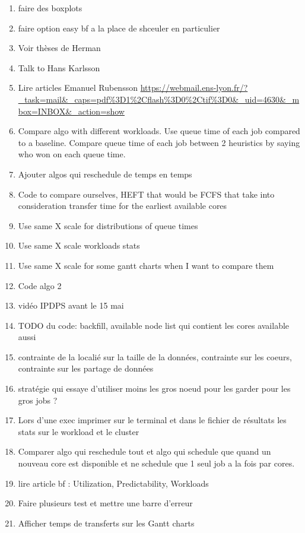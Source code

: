 \documentclass[a4paper]{article}
\begin{document}
\begin{enumerate}
			\item faire des boxplots
			\item faire option easy bf a la place de shceuler en particulier
			\item Voir thèses de Herman
			\item Talk to Hans Karlsson
			\item Lire articles Emanuel Rubensson \url{https://webmail.ens-lyon.fr/?_task=mail&_caps=pdf%3D1%2Cflash%3D0%2Ctif%3D0&_uid=4630&_mbox=INBOX&_action=show}
			\item Compare algo with different workloads. Use queue time of each job compared to a baseline. Compare queue time of each job between 2 heuristics by saying who won on each queue time.
			\item Ajouter algos qui reschedule de temps en temps
			\item Code to compare ourselves, HEFT that would be FCFS that take into consideration transfer time for the earliest available cores
			\item Use same X scale for distributions of queue times
			\item Use same X scale workloads stats
			\item Use same X scale for some gantt charts when I want to compare them
			\item Code algo 2
			\item vidéo IPDPS avant le 15 mai
			\item TODO du code: backfill, available node list qui contient les cores available aussi
			\item contrainte de la localié sur la taille de la données, contrainte sur les coeurs, contrainte sur les partage de données
			\item stratégie qui essaye d'utiliser moins les gros noeud pour les garder pour les gros jobs ?
			\item Lors d'une exec imprimer sur le terminal et dans le fichier de résultats les stats sur le workload et le cluster
			\item Comparer algo qui reschedule tout et algo qui schedule que quand un nouveau core est disponible et ne schedule que 1 seul job a la fois par cores.
			\item lire article bf : Utilization, Predictability, Workloads
			\item Faire plusieurs test et mettre une barre d'erreur
			\item Afficher temps de transferts sur les Gantt charts
		\end{enumerate}
\end{document}
